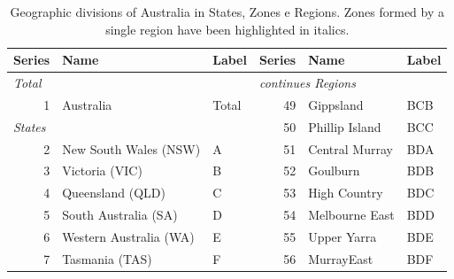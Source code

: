 \documentclass[a4paper,11pt]{article}
\theoremstyle{definition}
\begin{document}
\begin{table}[H]
	\caption{Geographic divisions of Australia in States, Zones e Regions. Zones formed by a single region have been highlighted in italics.}
	\label{tab:australia}
	\fontsize{9}{10}\selectfont
	\centering
	\begin{tabular}{r l l|r l l}
		\toprule
		\textbf{Series}                      & \textbf{Name}           & \textbf{Label} & \textbf{Series}                                 & \textbf{Name}                   & \textbf{Label} \\
		\midrule
		\multicolumn{1}{l}{\textit{Total}}   &                         &                & \multicolumn{3}{l|}{\textit{continues Regions}}                                                    \\
		1                                    & Australia               & Total          & 49                                              & Gippsland                       & BCB            \\
		\cline{1-3}
		\multicolumn{1}{l}{\textit{States}}  &                         &                & 50                                              & Phillip Island                  & BCC            \\
		2                                    & New South Wales (NSW)   & A              & 51                                              & Central Murray                  & BDA            \\
		3                                    & Victoria (VIC)          & B              & 52                                              & Goulburn                        & BDB            \\
		4                                    & Queensland (QLD)        & C              & 53                                              & High Country                    & BDC            \\
		5                                    & South Australia (SA)    & D              & 54                                              & Melbourne East                  & BDD            \\
		6                                    & Western Australia (WA)  & E              & 55                                              & Upper Yarra                     & BDE            \\
		7                                    & Tasmania (TAS)          & F              & 56                                              & MurrayEast                      & BDF            \\

\end{tabular}
\end{table}
\end{document}
